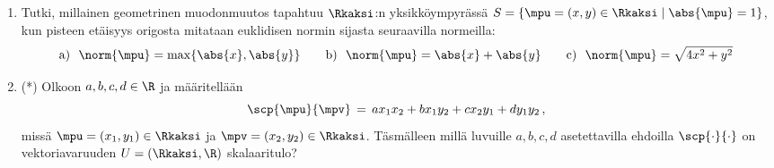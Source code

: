 \begin{enumerate}
\item
Tutki, millainen geometrinen muodonmuutos tapahtuu $\Rkaksi$:n yksikköympyrässä
$S=\{\mpu=(x,y)\in\Rkaksi \mid \abs{\mpu}=1\}$, kun pisteen etäisyys origosta mitataan 
euklidisen normin sijasta seuraavilla normeilla:
\[
\text{a)}\ \ \norm{\mpu}=\max\{\abs{x},\abs{y}\} \qquad
\text{b)}\ \ \norm{\mpu}=\abs{x}+\abs{y} \qquad
\text{c)}\ \ \norm{\mpu}=\sqrt{4x^2+y^2}
\]

\item (*)
Olkoon $a,b,c,d\in\R$ ja määritellään
\[
\scp{\mpu}{\mpv}\,=\,ax_1x_2+bx_1y_2+cx_2y_1+dy_1y_2\,,
\]
missä $\mpu=(x_1,y_1)\in\Rkaksi$ ja $\mpv=(x_2,y_2)\in\Rkaksi$. Täsmälleen millä luvuille
$a,b,c,d$ asetettavilla ehdoilla $\scp{\cdot}{\cdot}$ on vektoriavaruuden $U=(\Rkaksi,\R)$ 
skalaaritulo?

\end{enumerate}